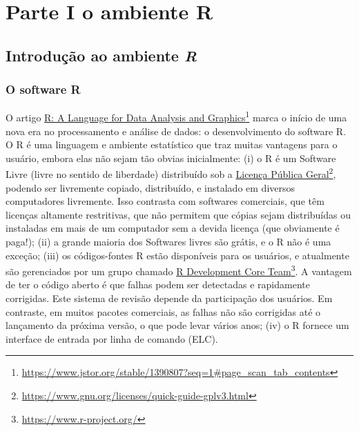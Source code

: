 \documentclass[
]{book}
\begin{document}
\hypertarget{part-parte-i-o-ambiente-r}{%
\part{Parte I o ambiente R}\label{part-parte-i-o-ambiente-r}}

\hypertarget{intro}{%
\chapter{\texorpdfstring{Introdução ao ambiente \emph{R}}{Introdução ao ambiente R}}\label{intro}}

\hypertarget{o-software-r}{%
\section{O software R}\label{o-software-r}}

O artigo \href{https://www.jstor.org/stable/1390807?seq=1\#page_scan_tab_contents}{R: A Language for Data Analysis and Graphics}\footnote{\url{https://www.jstor.org/stable/1390807?seq=1\#page_scan_tab_contents}} marca o início de uma nova era no processamento e análise de dados: o desenvolvimento do software R. O R é uma linguagem e ambiente estatístico que traz muitas vantagens para o usuário, embora elas não sejam tão obvias inicialmente: (i) o R é um Software Livre (livre no sentido de liberdade) distribuído sob a \href{https://www.gnu.org/licenses/quick-guide-gplv3.html}{Licença Pública Geral}\footnote{\url{https://www.gnu.org/licenses/quick-guide-gplv3.html}}, podendo ser livremente copiado, distribuído, e instalado em diversos computadores livremente. Isso contrasta com softwares comerciais, que têm licenças altamente restritivas, que não permitem que cópias sejam distribuídas ou instaladas em mais de um computador sem a devida licença (que obviamente é paga!); (ii) a grande maioria dos Softwares livres são grátis, e o R não é uma exceção; (iii) os códigos-fontes R estão disponíveis para os usuários, e atualmente são gerenciados por um grupo chamado \href{https://www.r-project.org/}{R Development Core Team}\footnote{\url{https://www.r-project.org/}}. A vantagem de ter o código aberto é que falhas podem ser detectadas e rapidamente corrigidas. Este sistema de revisão depende da participação dos usuários. Em contraste, em muitos pacotes comerciais, as falhas não são corrigidas até o lançamento da próxima versão, o que pode levar vários anos; (iv) o R fornece um interface de entrada por linha de comando (ELC).
\end{document}
